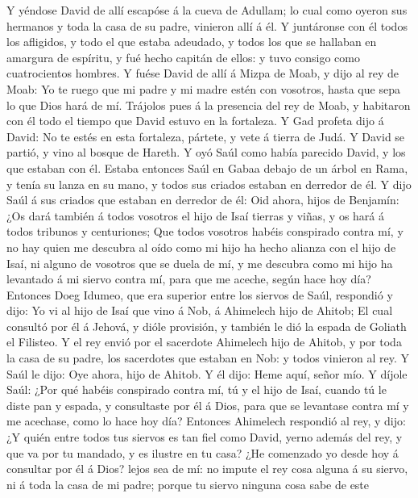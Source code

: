  Y yéndose David de allí escapóse á la cueva de Adullam; lo
cual como oyeron sus hermanos y toda la casa de su padre, vinieron allí
á él.  Y juntáronse con él todos los afligidos, y todo el
que estaba adeudado, y todos los que se hallaban en amargura de
espíritu, y fué hecho capitán de ellos: y tuvo consigo como
cuatrocientos hombres.  Y fuése David de allí á Mizpa de
Moab, y dijo al rey de Moab: Yo te ruego que mi padre y mi madre estén
con vosotros, hasta que sepa lo que Dios hará de mí. 
Trájolos pues á la presencia del rey de Moab, y habitaron con él todo el
tiempo que David estuvo en la fortaleza.  Y Gad profeta dijo
á David: No te estés en esta fortaleza, pártete, y vete á tierra de
Judá. Y David se partió, y vino al bosque de Hareth.  Y oyó
Saúl como había parecido David, y los que estaban con él. Estaba
entonces Saúl en Gabaa debajo de un árbol en Rama, y tenía su lanza en
su mano, y todos sus criados estaban en derredor de él.  Y
dijo Saúl á sus criados que estaban en derredor de él: Oid ahora, hijos
de Benjamín: ¿Os dará también á todos vosotros el hijo de Isaí tierras y
viñas, y os hará á todos tribunos y centuriones;  Que todos
vosotros habéis conspirado contra mí, y no hay quien me descubra al oído
como mi hijo ha hecho alianza con el hijo de Isaí, ni alguno de vosotros
que se duela de mí, y me descubra como mi hijo ha levantado á mi siervo
contra mí, para que me aceche, según hace hoy día?  Entonces
Doeg Idumeo, que era superior entre los siervos de Saúl, respondió y
dijo: Yo vi al hijo de Isaí que vino á Nob, á Ahimelech hijo de Ahitob;
 El cual consultó por él á Jehová, y dióle provisión, y
también le dió la espada de Goliath el Filisteo.  Y el rey
envió por el sacerdote Ahimelech hijo de Ahitob, y por toda la casa de
su padre, los sacerdotes que estaban en Nob: y todos vinieron al rey.
 Y Saúl le dijo: Oye ahora, hijo de Ahitob. Y él dijo: Heme
aquí, señor mío.  Y díjole Saúl: ¿Por qué habéis conspirado
contra mí, tú y el hijo de Isaí, cuando tú le diste pan y espada, y
consultaste por él á Dios, para que se levantase contra mí y me
acechase, como lo hace hoy día?  Entonces Ahimelech
respondió al rey, y dijo: ¿Y quién entre todos tus siervos es tan fiel
como David, yerno además del rey, y que va por tu mandado, y es ilustre
en tu casa?  ¿He comenzado yo desde hoy á consultar por él
á Dios? lejos sea de mí: no impute el rey cosa alguna á su siervo, ni á
toda la casa de mi padre; porque tu siervo ninguna cosa sabe de este
